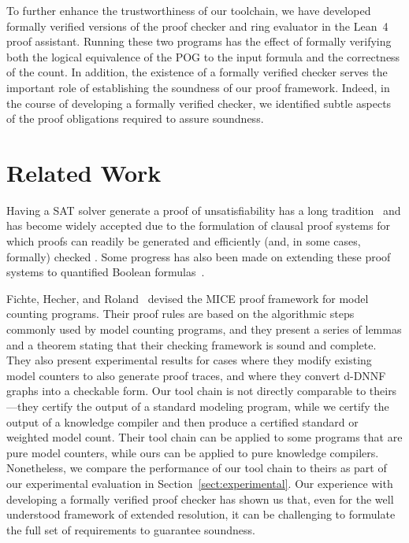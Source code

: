 \documentclass[letterpaper,USenglish,cleveref, autoref, thm-restate]{lipics-v2021}
\newcommand{\lean}{Lean~4}
\begin{document}
To further enhance the trustworthiness of our toolchain, we have
developed formally verified versions of the proof checker and ring
evaluator in the \lean{} proof assistant.  Running these two programs
has the effect of formally verifying both the logical equivalence of
the POG to the input formula and the correctness of the count.  In
addition, the existence of a formally verified checker serves the
important role of establishing the soundness of our proof framework.
Indeed, in the course of developing a formally verified checker, we
identified subtle aspects of the proof obligations required to assure
soundness.

\section{Related Work}

Having a SAT solver generate a proof of unsatisfiability has a long
tradition~\cite{ZhangMalik} and has become widely accepted due to the
formulation of clausal proof systems for which proofs can readily be
generated and efficiently (and, in some cases, formally) checked
\cite{cruz-cade-2017,RAT,Tan:2021,wetzler14_drattrim}.  Some progress has also
been made on extending these proof systems to quantified Boolean
formulas~\cite{bryant:cade:2021,heule:JAR2014}.

Fichte, Hecher, and Roland~\cite{fichte:sat:2022} devised the MICE
proof framework for model counting programs.  Their proof rules are
based on the algorithmic steps commonly used by model counting
programs, and they present a series of lemmas and a theorem stating
that their checking framework is sound and complete.  They also
present experimental results for cases where they modify existing
model counters to also generate proof traces, and where they convert
d-DNNF graphs into a checkable form.  Our tool chain is not directly
comparable to theirs---they certify the output of a standard modeling
program, while we certify the output of a knowledge compiler and then
produce a certified standard or weighted model count.  Their tool
chain can be applied to some programs that are pure model counters,
while ours can be applied to pure knowledge compilers.  Nonetheless,
we compare the performance of our tool chain to theirs as part of our
experimental evaluation in Section~\ref{sect:experimental}.  Our
experience with developing a formally verified proof checker has shown
us that, even for the well understood framework of extended
resolution, it can be challenging to formulate the full set of requirements to guarantee soundness.
\end{document}
